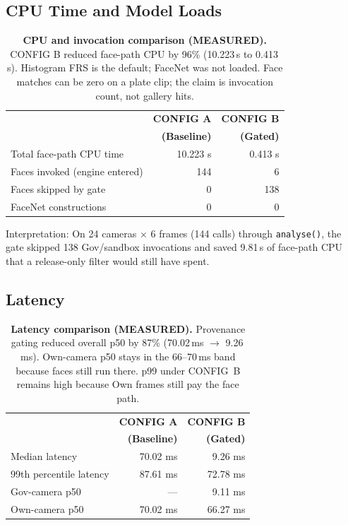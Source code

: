 \documentclass[sigplan,review]{acmart}
\begin{document}
\subsection{CPU Time and Model Loads}

\begin{table}[h]
  \centering
  \small
  \begin{tabular}{lrr}
    \toprule
    & \textbf{CONFIG A} & \textbf{CONFIG B} \\
    & \textbf{(Baseline)} & \textbf{(Gated)} \\
    \midrule
    Total face-path CPU time & 10.223 s & 0.413 s \\
    Faces invoked (engine entered) & 144 & 6 \\
    Faces skipped by gate & 0 & 138 \\
    FaceNet constructions & 0 & 0 \\
    \bottomrule
  \end{tabular}
  \caption{\textbf{CPU and invocation comparison (MEASURED).} CONFIG B reduced face-path CPU by 96\% (10.223\,s to 0.413\,s). Histogram FRS is the default; FaceNet was not loaded. Face matches can be zero on a plate clip; the claim is invocation count, not gallery hits.}
  \label{tab:cpu}
\end{table}

Interpretation: On 24 cameras $\times$ 6 frames (144 calls) through \texttt{analyse()}, the gate skipped 138 Gov/sandbox invocations and saved 9.81\,s of face-path CPU that a release-only filter would still have spent.

\subsection{Latency}

\begin{table}[h]
  \centering
  \small
  \begin{tabular}{lrr}
    \toprule
    & \textbf{CONFIG A} & \textbf{CONFIG B} \\
    & \textbf{(Baseline)} & \textbf{(Gated)} \\
    \midrule
    Median latency & 70.02 ms & 9.26 ms \\
    99th percentile latency & 87.61 ms & 72.78 ms \\
    Gov-camera p50 & --- & 9.11 ms \\
    Own-camera p50 & 70.02 ms & 66.27 ms \\
    \bottomrule
  \end{tabular}
  \caption{\textbf{Latency comparison (MEASURED).} Provenance gating reduced overall p50 by 87\% (70.02\,ms $\to$ 9.26\,ms). Own-camera p50 stays in the 66--70\,ms band because faces still run there. p99 under CONFIG~B remains high because Own frames still pay the face path.}
  \label{tab:latency}
\end{table}
\end{document}
